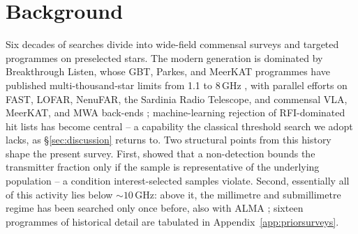 \documentclass{openjournal}
\begin{document}
\section{Background}
\label{sec:background}

Six decades of searches divide into wide-field commensal surveys and
targeted programmes on preselected stars. The modern generation is
dominated by Breakthrough Listen, whose GBT, Parkes, and MeerKAT
programmes have published multi-thousand-star limits from 1.1 to
8\,GHz \citep{BLoverview,Enriquez2017,Price2020,BLMeerKAT2026}, with
parallel efforts on FAST, LOFAR, NenuFAR, the Sardinia Radio Telescope,
and commensal VLA, MeerKAT, and MWA back-ends
\citep{Zhang2020,LOFARdualsite2023,SRT2025,Tremblay2024};
machine-learning rejection of RFI-dominated hit lists has become
central \citep{Ma2023,Choza2024,GLOBULAR2025,AnomalyParkesGBT2025,
BRaTs2026} -- a capability the classical threshold search we adopt
lacks, as \S\ref{sec:discussion} returns to. Two structural points
from this history shape the present survey. First,
\citet{Margot2023} showed that a non-detection bounds the transmitter
fraction only if the sample is representative of the underlying
population -- a condition interest-selected samples violate. Second,
essentially all of this activity lies below ${\sim}10$\,GHz: above it,
the millimetre and submillimetre regime has been searched only once
before, also with ALMA \citep{Mason2024}; sixteen programmes of
historical detail are tabulated in Appendix~\ref{app:priorsurveys}.
\end{document}
